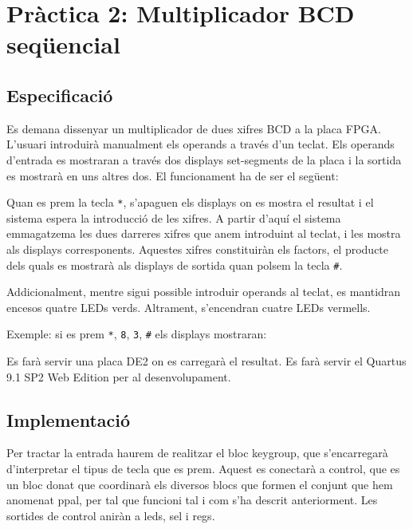 \chapter{Pràctica 2: Multiplicador BCD seqüencial}

\section{Especificació}

Es demana dissenyar un multiplicador de dues xifres BCD a la placa FPGA. L'usuari introduirà manualment els operands a través d'un teclat. Els operands d'entrada es mostraran a través dos displays set-segments de la placa i la sortida es mostrarà en uns altres dos. El funcionament ha de ser el següent:

Quan es prem la tecla \texttt{*}, s'apaguen els displays on es mostra el resultat i el sistema espera la introducció de les xifres. A partir d'aquí el sistema emmagatzema les dues darreres xifres que anem introduint al teclat, i les mostra als displays corresponents. Aquestes xifres constituiràn els factors, el producte dels quals es mostrarà als displays de sortida quan polsem la tecla \texttt{\#}.

Addicionalment, mentre sigui possible introduir operands al teclat, es mantidran encesos quatre LEDs verds. Altrament, s'encendran cuatre LEDs vermells.

Exemple: si es prem \texttt{*}, \texttt{8}, \texttt{3}, \texttt{\#} els displays mostraran:

\begin{center}
\sevenseg{ }\sevenseg{ }\sevenseg{ }\sevenseg{ }
\end{center}

Es farà servir una placa DE2 on es carregarà el resultat. Es farà servir el Quartus 9.1 SP2 Web Edition per al desenvolupament.

\section{Implementació}

Per tractar la entrada haurem de realitzar el bloc \textsf{keygroup}, que s'encarregarà d'interpretar el tipus de tecla que es prem. Aquest es conectarà a \textsf{control}, que es un bloc donat que coordinarà els diversos blocs que formen el conjunt que hem anomenat \textsf{ppal}, per tal que funcioni tal i com s'ha descrit anteriorment. Les sortides de \textsf{control} aniràn a \textsf{leds}, \textsf{sel} i \textsf{regs}.


